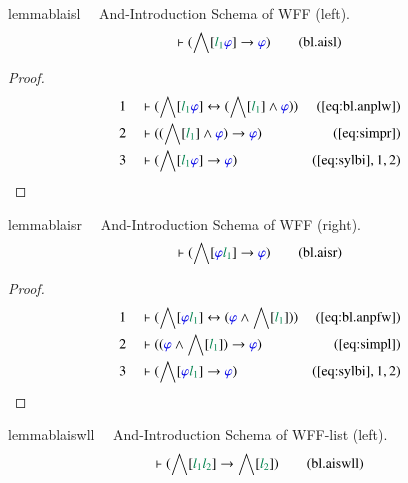 \begin{restatable}{lemma}{blaisl}~~ And-Introduction Schema of WFF (left).
\begin{align}
\vdash ( \bigwedge[ \mwl{l_1} \mw{\varphi} ] \rightarrow \mw{\varphi}
    )\label{eq:bl.aisl}\tag{bl.aisl}
\end{align}
\end{restatable}

\begin{proof}
\begin{align}
  1 &&  & \vdash ( \bigwedge[ \mwl{l_1} \mw{\varphi} ] \leftrightarrow (
      \bigwedge[ \mwl{l_1} ] \wedge \mw{\varphi} )
      )&(\mbox{\ref{eq:bl.anplw}})\notag
  \\ 2 &&  & \vdash ( ( \bigwedge[ \mwl{l_1} ] \wedge \mw{\varphi} )
      \rightarrow \mw{\varphi}
      )&(\mbox{\ref{eq:simpr}})\notag
  \\ 3 &&  & \vdash ( \bigwedge[ \mwl{l_1} \mw{\varphi} ] \rightarrow
      \mw{\varphi} )&(\mbox{\ref{eq:sylbi}},1,2)\notag
\end{align}
\end{proof}

\begin{restatable}{lemma}{blaisr}~~ And-Introduction Schema of WFF (right).
\begin{align}
\vdash ( \bigwedge[ \mw{\varphi} \mwl{l_1} ] \rightarrow \mw{\varphi}
    )\label{eq:bl.aisr}\tag{bl.aisr}
\end{align}
\end{restatable}

\begin{proof}
\begin{align}
  1 &&  & \vdash ( \bigwedge[ \mw{\varphi} \mwl{l_1} ] \leftrightarrow (
      \mw{\varphi} \wedge \bigwedge[ \mwl{l_1} ] )
      )&(\mbox{\ref{eq:bl.anpfw}})\notag
  \\ 2 &&  & \vdash ( ( \mw{\varphi} \wedge \bigwedge[ \mwl{l_1} ] )
      \rightarrow \mw{\varphi}
      )&(\mbox{\ref{eq:simpl}})\notag
  \\ 3 &&  & \vdash ( \bigwedge[ \mw{\varphi} \mwl{l_1} ] \rightarrow
      \mw{\varphi} )&(\mbox{\ref{eq:sylbi}},1,2)\notag
\end{align}
\end{proof}

\begin{restatable}{lemma}{blaiswll}~~ And-Introduction Schema of WFF-list
(left).
\begin{align}
\vdash ( \bigwedge[ \mwl{l_1} \mwl{l_2} ] \rightarrow \bigwedge[ \mwl{l_2} ]
    )\label{eq:bl.aiswll}\tag{bl.aiswll}
\end{align}
\end{restatable}


